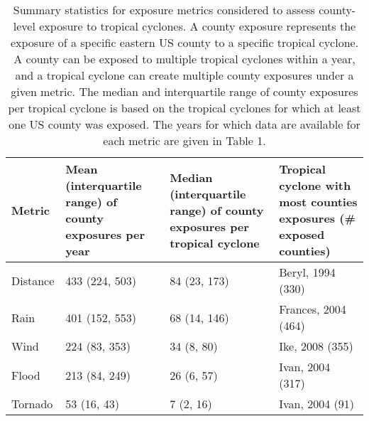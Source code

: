 \begin{table}[ht]
\centering
\caption{Summary statistics for exposure metrics considered to assess county-level exposure to
         tropical cyclones. A county exposure represents the exposure of a specific eastern US
         county to a specific tropical cyclone. A county can be exposed to multiple tropical cyclones within
         a year, and a tropical cyclone can create multiple county exposures under a given metric.
         The median and interquartile range of county exposures per tropical cyclone is based on
         the tropical cyclones for which at least one US county was exposed. The years for which
         data are available for each metric are given in Table 1.} 
\label{tab:exposuresummaries}
\begin{tabular}{p{1.75cm}p{3cm}p{4cm}p{4cm}}
  \toprule
Metric & Mean (interquartile range) of county exposures per year & Median (interquartile range) of county exposures per tropical cyclone & Tropical cyclone with most counties exposures (\# exposed counties) \\ 
  \midrule
Distance & 433 (224, 503) & 84 (23, 173) & Beryl, 1994 (330) \\ 
  Rain & 401 (152, 553) & 68 (14, 146) & Frances, 2004 (464) \\ 
  Wind & 224 (83, 353) & 34 (8, 80) & Ike, 2008 (355) \\ 
  Flood & 213 (84, 249) & 26 (6, 57) & Ivan, 2004 (317) \\ 
  Tornado & 53 (16, 43) & 7 (2, 16) & Ivan, 2004 (91) \\ 
   \bottomrule
\end{tabular}
\end{table}
